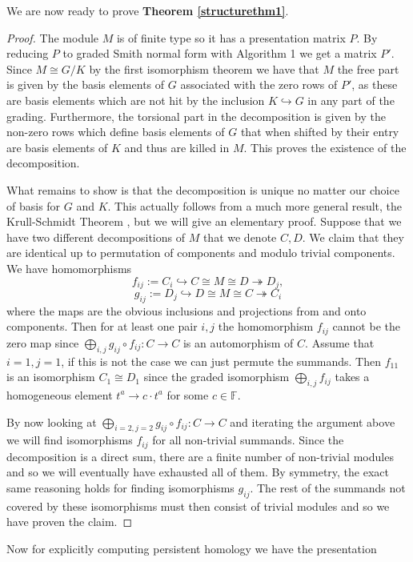 We are now ready to prove \textbf{Theorem \ref{structurethm1}}.

\begin{proof}
  The module $M$ is of finite type so it has a presentation matrix $P$. By reducing $P$ to graded Smith normal form with Algorithm 1 we get a matrix $P'$. Since $M \cong G/K$ by the first isomorphism theorem we have that $M$ the free part is given by the basis elements of $G$ associated with the zero rows of $P'$, as these are basis elements which are not hit by the inclusion $K \hookrightarrow G$ in any part of the grading. Furthermore, the torsional part in the decomposition is given by the non-zero rows which define basis elements of $G$ that when shifted by their entry are basis elements of $K$ and thus are killed in $M$. This proves the existence of the decomposition.

  What remains to show is that the decomposition is unique no matter our choice of basis for $G$ and $K$. This actually follows from a much more general result, the Krull-Schmidt Theorem \cite[p. ~115]{jacobson2009basic}, but we will give an elementary proof. Suppose that we have two different decompositions of $M$ that we denote $C,D$. We claim that they are identical up to permutation of components and modulo trivial components. We have homomorphisms
  \[
    f_{ij} := C_{i} \hookrightarrow C \cong M  \cong D  \twoheadrightarrow D_{j},
  \]
  \[
    g_{ij} :=  D_{j} \hookrightarrow D \cong M  \cong C  \twoheadrightarrow C_{i}
  \]
  where the maps are the obvious inclusions and projections from and onto components. Then for at least one pair $i,j$ the homomorphism $f_{ij}$ cannot be the zero map since $\bigoplus_{i,j} g_{ij} \circ f_{ij}: C \to C$ is an automorphism of $C$. Assume that $i=1,j=1$, if this is not the case we can just permute the summands.  Then $f_{11}$ is an isomorphism $C_{1} \cong D_{1}$ since the graded isomorphism $\bigoplus_{i,j} f_{ij}$ takes a homogeneous element $t^{a} \to c \cdot t^{a}$ for some $c \in \mathbb{F}$.

  By now looking at $\bigoplus_{i=2,j=2} g_{ij} \circ f_{ij}: C \to C$ and iterating the argument above we will find isomorphisms $f_{ij}$ for all non-trivial summands. Since the decomposition is a direct sum, there are a finite number of non-trivial modules and so we will eventually have exhausted all of them. By symmetry, the exact same reasoning holds for finding isomorphisms $g_{ij}$. The rest of the summands not covered by these isomorphisms must then consist of trivial modules and so we have proven the claim.

\end{proof}
Now for explicitly computing persistent homology we have the presentation

